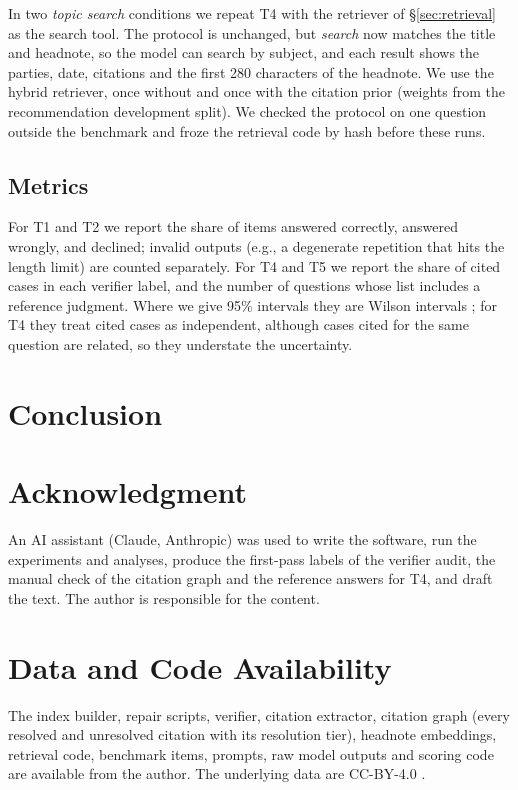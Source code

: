 \documentclass[conference]{IEEEtran}
\begin{document}
In two \emph{topic search} conditions we repeat T4 with the retriever of \S\ref{sec:retrieval} as the search tool. The protocol is unchanged, but \emph{search} now matches the title and headnote, so the model can search by subject, and each result shows the parties, date, citations and the first 280 characters of the headnote. We use the hybrid retriever, once without and once with the citation prior (weights from the recommendation development split). We checked the protocol on one question outside the benchmark and froze the retrieval code by hash before these runs.

\subsection{Metrics}
For T1 and T2 we report the share of items answered correctly, answered wrongly, and declined; invalid outputs (e.g., a degenerate repetition that hits the length limit) are counted separately. For T4 and T5 we report the share of cited cases in each verifier label, and the number of questions whose list includes a reference judgment. Where we give 95\% intervals they are Wilson intervals \cite{wilson}; for T4 they treat cited cases as independent, although cases cited for the same question are related, so they understate the uncertainty.





\section{Conclusion}
\label{sec:conclusion}


\section*{Acknowledgment}
An AI assistant (Claude, Anthropic) was used to write the software, run the experiments and analyses, produce the first-pass labels of the verifier audit, the manual check of the citation graph and the reference answers for T4, and draft the text. The author is responsible for the content.

\section*{Data and Code Availability}
The index builder, repair scripts, verifier, citation extractor, citation graph (every resolved and unresolved citation with its resolution tier), headnote embeddings, retrieval code, benchmark items, prompts, raw model outputs and scoring code are available from the author. The underlying data are CC-BY-4.0 \cite{awssc,awshc}.



\end{document}
